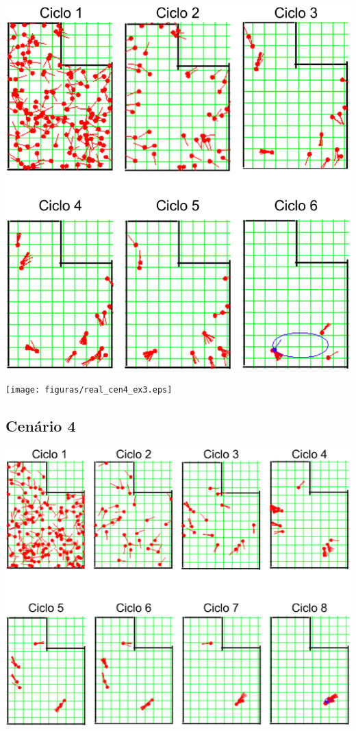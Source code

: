 {\centering
\includegraphics[scale=0.4]{figuras/cen4_ex3.eps}
\label{img:cen4_ex3}
\par}

{\centering
\texttt{[image: figuras/real\_cen4\_ex3.eps]}
\label{img:real_cen4_ex3}
\par}

\subsection{Cenário 4}

{\centering
\includegraphics[scale=0.4]{figuras/cen4_ex4.eps}
\label{img:cen4_ex4}
\par}

